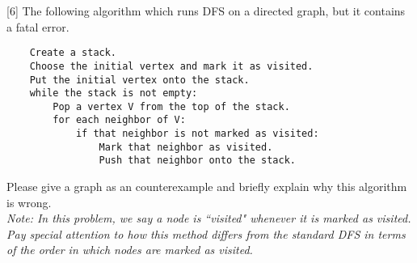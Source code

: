 \raggedright
{}[6]
The following algorithm which runs DFS on a directed graph, but it contains a fatal error.
\begin{lstlisting}
    Create a stack.
    Choose the initial vertex and mark it as visited.
    Put the initial vertex onto the stack.
    while the stack is not empty:
        Pop a vertex V from the top of the stack.
        for each neighbor of V:
            if that neighbor is not marked as visited:
                Mark that neighbor as visited.
                Push that neighbor onto the stack.
\end{lstlisting}

    
Please give a graph as an counterexample and briefly explain why this algorithm is wrong. 
\\
\textit{Note: In this problem, we say a node is ``visited" whenever it is marked as visited. Pay special attention to how this method differs from the standard DFS in terms of the order in which nodes are marked as visited.}\\


\raggedright
\begin{solution}
    \vspace{200pt}
\end{solution}